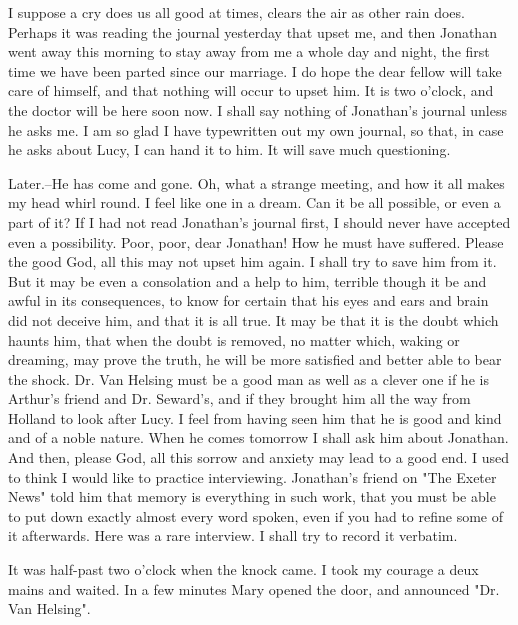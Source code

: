 I suppose a cry does us all good at times, clears the air as other rain does. Perhaps it was reading the journal yesterday that upset me, and then Jonathan went away this morning to stay away from me a whole day and night, the first time we have been parted since our marriage. I do hope the dear fellow will take care of himself, and that nothing will occur to upset him. It is two o'clock, and the doctor will be here soon now. I shall say nothing of Jonathan's journal unless he asks me. I am so glad I have typewritten out my own journal, so that, in case he asks about Lucy, I can hand it to him. It will save much questioning. 

Later.--He has come and gone. Oh, what a strange meeting, and how it all makes my head whirl round. I feel like one in a dream. Can it be all possible, or even a part of it? If I had not read Jonathan's journal first, I should never have accepted even a possibility. Poor, poor, dear Jonathan! How he must have suffered. Please the good God, all this may not upset him again. I shall try to save him from it. But it may be even a consolation and a help to him, terrible though it be and awful in its consequences, to know for certain that his eyes and ears and brain did not deceive him, and that it is all true. It may be that it is the doubt which haunts him, that when the doubt is removed, no matter which, waking or dreaming, may prove the truth, he will be more satisfied and better able to bear the shock. Dr. Van Helsing must be a good man as well as a clever one if he is Arthur's friend and Dr. Seward's, and if they brought him all the way from Holland to look after Lucy. I feel from having seen him that he is good and kind and of a noble nature. When he comes tomorrow I shall ask him about Jonathan. And then, please God, all this sorrow and anxiety may lead to a good end. I used to think I would like to practice interviewing. Jonathan's friend on "The Exeter News" told him that memory is everything in such work, that you must be able to put down exactly almost every word spoken, even if you had to refine some of it afterwards. Here was a rare interview. I shall try to record it verbatim. 

It was half-past two o'clock when the knock came. I took my courage a deux mains and waited. In a few minutes Mary opened the door, and announced "Dr. Van Helsing". 

